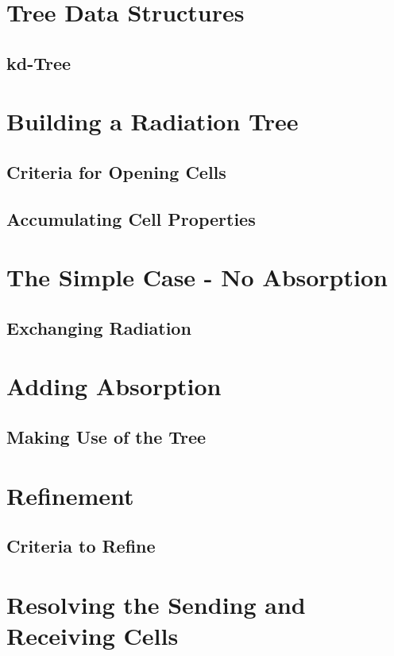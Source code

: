 \section{Tree Data Structures}



\subsection{kd-Tree}

\section{Building a Radiation Tree}

\subsection{Criteria for Opening Cells}

\subsection{Accumulating Cell Properties}

\section{The Simple Case - No Absorption}

\subsection{Exchanging Radiation}

\section{Adding Absorption}

\subsection{Making Use of the Tree}

\section{Refinement}

\subsection{Criteria to Refine}

\section{Resolving the Sending and Receiving Cells}
